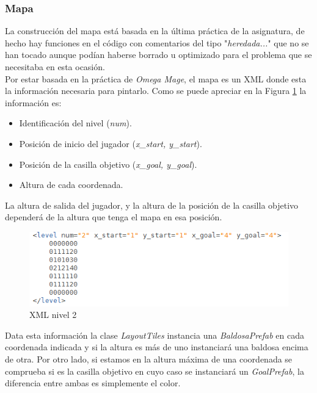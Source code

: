 \documentclass{article}
\begin{document}
\subsubsection{Mapa}
La construcción del mapa está basada en la última práctica de la asignatura, de hecho hay funciones en el código con comentarios del tipo "\emph{heredada...}" que no se han tocado aunque podían haberse borrado u optimizado para el problema que se necesitaba en esta ocasión. \\

Por estar basada en la práctica de \emph{Omega Mage}, el mapa es un XML donde esta la información necesaria para pintarlo. Como se puede apreciar en la Figura \ref{fig:xml} la información es:
\begin{itemize}
    \item Identificación del nivel (\emph{num}).
    \item Posición de inicio del jugador (\emph{x\_start, y\_start}).
    \item Posición de la casilla objetivo (\emph{x\_goal, y\_goal}).
    \item Altura de cada coordenada.
\end{itemize}

La altura de salida del jugador, y la altura de la posición de la casilla objetivo dependerá de la altura que tenga el mapa en esa posición.\\

\begin{figure}[h!]
\centering
\includegraphics[scale=.9]{xml.png}
\caption{XML nivel 2}
\label{fig:xml}
\end{figure}

Data esta información la clase \emph{LayoutTiles} instancia una \emph{BaldosaPrefab} en cada coordenada indicada y si la altura es más de uno instanciará una baldosa encima de otra. Por otro lado, si estamos en la altura máxima de una coordenada se comprueba si es la casilla objetivo en cuyo caso se instanciará un \emph{GoalPrefab}, la diferencia entre ambas es simplemente el color. \\
\end{document}
